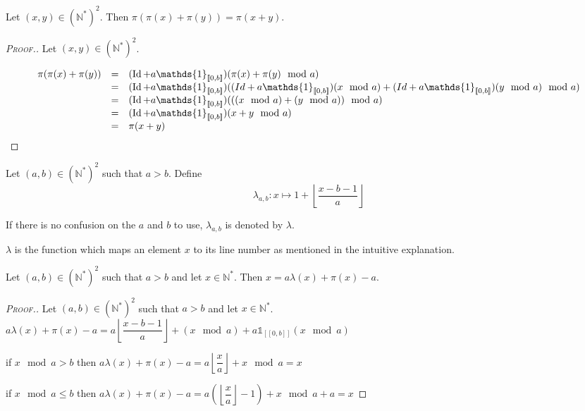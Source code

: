 \begin{proposition}
Let \((x,y)\in (\mathbb{N}^*)^2\). Then \(\pi(\pi(x)+\pi(y))=\pi(x+y)\).
\end{proposition}

\begin{proof}[\textsc{Proof.}]
Let \((x,y)\in (\mathbb{N}^*)^2\).

\[
\begin{array}{c c l}
	\pi(\pi(x)+\pi(y)) & = & (\operatorname{Id}+a\mathds{1}_{ [\![0,b]\!]})(\pi(x)+\pi(y) \mod a)\\
	& = & (\operatorname{Id}+a\mathds{1}_{ [\![0,b]\!]})((Id+a\mathds{1}_{ [\![0,b]\!]})(x \mod a)+(Id+a\mathds{1}_{ [\![0,b]\!]})(y \mod a) \mod a) \\
	& = & (\operatorname{Id}+a\mathds{1}_{ [\![0,b]\!]})(((x \mod a) + (y \mod a)) \mod a)\\
	& = & (\operatorname{Id}+a\mathds{1}_{ [\![0,b]\!]})( x+y \mod a)\\
	& = & \pi(x+y)
\end{array}
\]
\end{proof}

\begin{definition}

Let \((a,b) \in (\mathbb{N}^*)^2\) such that \(a>b\). Define
\[ \lambda_{a,b}:x \longmapsto 1+ \left\lfloor\dfrac{x-b-1}{a}\right\rfloor\]
\end{definition}

If there is no confusion on the \(a\) and \(b\) to use, \(\lambda_{a, b}\) is denoted by \(\lambda\).

\(\lambda\) is the function which maps an element \(x\) to its line number as mentioned in the intuitive explanation.

\begin{proposition}
Let \((a,b)\in (\mathbb{N}^*)^2\) such that \(a>b\) and let \(x\in \mathbb{N}^*\). Then \(x=a\lambda(x)+\pi(x)-a\).
\end{proposition}

\begin{proof}[\textsc{Proof.}]
Let \((a,b)\in (\mathbb{N}^*)^2\) such that \(a>b\) and let \(x\in \mathbb{N}^*\). \\
\(a\lambda(x)+\pi(x)-a=a\left\lfloor\dfrac{x-b-1}{a}\right\rfloor+(x \mod a)+ a \mathds{1}_{ [\![0,b]\!]}(x \mod a)\)

\noindent  if \(x \mod a>b\) then \(a\lambda(x)+\pi(x)-a=a\left\lfloor\dfrac{x}{a}\right\rfloor+x \mod a=x\)

\noindent if \(x \mod a \leqslant b\) then
\(a\lambda(x)+\pi(x)-a=a \left( \left \lfloor \dfrac{x}{a} \right \rfloor - 1 \right)+x \mod a +a=x\)
\end{proof}


